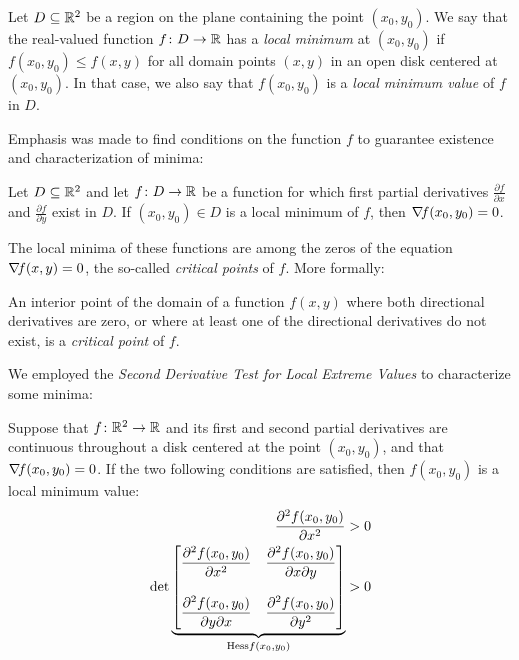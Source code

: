 \begin{definition}\label{def:localminimum}
Let $D\subseteq \mathbb{R}^2$ be a region on the plane containing the point $(x_0, y_0)$.  We say that the real-valued function $f\colon D \to \mathbb{R}$ has a \emph{local minimum} at $(x_0,y_0)$ if $f(x_0,y_0) \leq f(x,y)$ for all domain points $(x,y)$ in an open disk centered at $(x_0,y_0)$.  In that case, we also say that $f(x_0,y_0)$ is a \emph{local minimum value} of $f$ in $D$.
\end{definition}

Emphasis was made to find conditions on the function $f$ to guarantee existence and characterization of minima:

\begin{theorem}\label{theorem:localminimum}
Let $D \subseteq \mathbb{R}^2$ and let $f \colon D \to \mathbb{R}$ be a function for which first partial derivatives $\frac{\partial f}{\partial x}$ and $\frac{\partial f}{\partial y}$ exist in $D$.  If $(x_0,y_0) \in D$ is a local minimum of $f$, then $\mathop{\nabla\! {f}}(x_0,y_0)=0$.
\end{theorem}

The local minima of these functions are among the zeros of the equation $\mathop{\nabla\! {f}}(x,y)=0$, the so-called \emph{critical points} of $f$. More formally:

\begin{definition}\label{def:criticalpoint}
An interior point of the domain of a function $f(x,y)$ where both directional derivatives are zero, or where at least one of the directional derivatives do not exist, is a \emph{critical point} of $f$.
\end{definition}

We employed the \emph{Second Derivative Test for Local Extreme Values} to characterize some minima:
\begin{theorem}\label{theorem:2DTforLEV}
Suppose that $f\colon \mathbb{R}^2 \to \mathbb{R}$ and its first and second partial derivatives are continuous throughout a disk centered at the point $(x_0,y_0)$, and that $\mathop{\nabla\! {f}}(x_0,y_0)=0$. If the two following conditions are satisfied, then $f(x_0,y_0)$ is a local minimum value:
\begin{align}
\frac{\partial^2 f (x_0,y_0)}{\partial x^2} &> 0 \\
\det \underbrace{\begin{bmatrix} 
\dfrac{\partial^2 f (x_0,y_0)}{\partial x^2} & \dfrac{\partial^2 f (x_0,y_0)}{\partial x \partial y} \\ & \\
\dfrac{\partial^2 f (x_0,y_0) }{\partial y \partial x} & \dfrac{\partial^2 f (x_0,y_0)}{\partial y^2}
\end{bmatrix}}_{\mathop{\mathrm{Hess}{f}}(x_0,y_0)} &> 0
\end{align}
\end{theorem}

